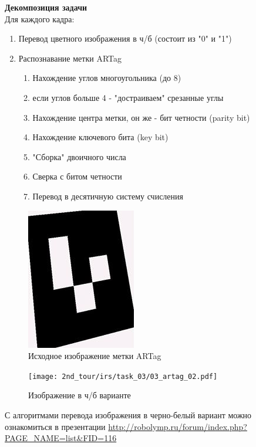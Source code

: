 \solutionSection

\textbf{Декомпозиция задачи} \\
Для каждого кадра:
\begin{enumerate}
	\item Перевод цветного изображения в ч/б (состоит из "0" и "1")
	\item Распознавание метки ARTag
	\begin{enumerate}
		\item Нахождение углов многоугольника (до 8)
		\item если углов больше 4 - "достраиваем" срезанные углы
		\item Нахождение центра метки, он же - бит четности (parity bit)
		\item Нахождение ключевого бита (key bit)
		\item "Сборка" двоичного числа
		\item Сверка с битом четности
		\item Перевод в десятичную систему счисления
	\end{enumerate}
\end{enumerate}

\begin{figure}[h]
	\centering
	\includegraphics[width=0.4\linewidth]{2nd_tour/irs/task_03/03_artag_01.jpg}
	\caption{Исходное изображение метки ARTag}
	\label{fig:03_artag_01}
\end{figure}

\begin{figure}[h]
	\centering
	\texttt{[image: 2nd\_tour/irs/task\_03/03\_artag\_02.pdf]}
	\caption{Изображение в ч/б варианте}
	\label{fig:03_artag_02}
\end{figure}

С алгоритмами перевода изображения в черно-белый вариант можно ознакомиться в презентации \url{http://robolymp.ru/forum/index.php?PAGE_NAME=list&FID=116}

